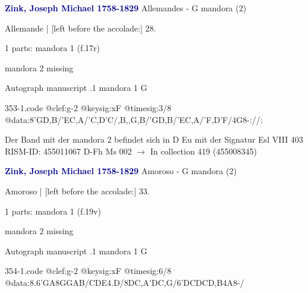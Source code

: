 \documentclass[twocolumn]{book}
\begin{document}
\newline \par \vspace{7pt} \textcolor{darkblue}{\textbf{Zink, Joseph Michael  1758-1829}}
\newline Allemandes - G
\newline mandora (2)
\newline \begin{itshape}[f.17r, at left:] Allemande | [left before the accolade:] 28.\end{itshape} 
\newline \textcolor{darkblue}{}  1 parts: mandora 1  (f.17r)
\newline \begin{small} mandora 2 missing\end{small} 
\newline Autograph manuscript
.1  mandora 1  G  
\begin{filecontents*}{353-1.code}
@clef:g-2
@keysig:xF
@timesig:3/8
@data:8'GD,B/'EC,A/'C,D'C/,B,,G,B/'GD,B/'EC,A/'F,D'F/4G8-://:
\end{filecontents*}
\newline
%

\newline Der Band mit der mandora 2 befindet sich in D Eu mit der Signatur Esl VIII 403
\newline RISM-ID: 455011067
\newline D-Fh  Ms 002
\newline $\rightarrow$ In collection 419 (455008345)
      
\newline \par \vspace{7pt} \textcolor{darkblue}{\textbf{Zink, Joseph Michael  1758-1829}}
\newline Amoroso - G
\newline mandora (2)
\newline \begin{itshape}[f.19v, at left:] Amoroso | [left before the accolade:] 33.\end{itshape} 
\newline \textcolor{darkblue}{}  1 parts: mandora 1  (f.19v)
\newline \begin{small} mandora 2 missing\end{small} 
\newline Autograph manuscript
.1  mandora 1  G  
\begin{filecontents*}{354-1.code}
@clef:g-2
@keysig:xF
@timesig:6/8
@data:{8.6'GA8G}{GAB}/{CDE}4.D/{8DC,A}{'DC,G}/{6'DCDCD,B}4A8-/
\end{filecontents*}
\newline
%
\end{document}
